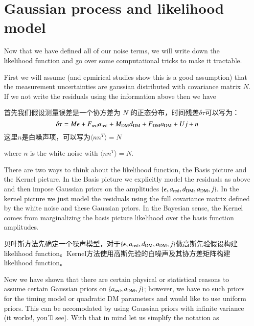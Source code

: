\chapter{Gaussian process and likelihood model}

Now that we have defined all of our noise terms, we will write down the likelihood function and go over some computational tricks to make it tractable.

First we will assume (and epmirical studies show this is a good assumption) that the measurement uncertainties are gaussian distributed with covariance matrix $N$. If we not write the residuals using the information above then we have

首先我们假设测量误差是一个协方差为 $N$ 的正态分布，时间残差$\delta \tau$可以写为：\cite{arzoumanian_nanograv_2016}
\begin{equation}
	\delta \tau = M\epsilon + F_{\rm red}a_{\rm red} + M_{\rm DM}d_{\rm DM} + F_{\rm DM}a_{\rm DM} + Uj + n
\end{equation}
这里$n$是白噪声项，可以写为$\langle n n^T \rangle = N$

where $n$ is the white noise with $\langle n n^T\rangle=N$. 

There are two ways to think about the likelihood function, the Basis picture and the Kernel picture. In the Basis picture we explicitly model the residuals as above and then impose Gaussian priors on the amplitudes $\{ \epsilon, a_{\rm red}, d_{\rm DM}, a_{\rm DM}, j \}$. In the kernel picture we just model the residuals using the full covariance matrix defined by the white noise and these Gaussian priors. In the Bayesian sense, the Kernel comes from marginalizing the basis picture likelihood over the basis function amplitudes. 

贝叶斯方法先确定一个噪声模型，对于$\{ \epsilon, a_{\rm red}, d_{\rm DM}, a_{\rm DM}, j \}$做高斯先验假设构建likelihood function。Kernel方法使用高斯先验的白噪声及其协方差矩阵构建likelihood function。

Now we have shown that there are certain physical or statistical reasons to assume certain Gaussian priors on $\{ a_{\rm red}, a_{\rm DM}, j \}$; however, we have no such priors for the timing model or quadratic DM parameters and would like to use uniform priors. This can be accomodated by using Gaussian priors with infinite variance (it works!, you'll see). With that in mind let us simplify the notation as 

